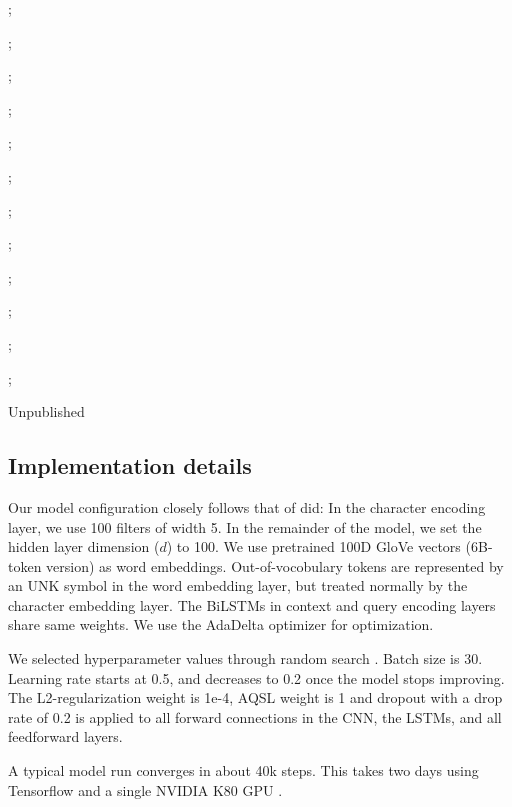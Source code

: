 \documentclass[11pt,letterpaper]{article}
\makeatletter
\newcommand{\ssymbol}[1]{^{\@fnsymbol{#1}}}
\makeatother
\begin{document}
\begin{table}[t]
\begin{threeparttable}
\begin{tablenotes}
\item[a]\citet{Rajpurkar:2016vf};\item[b] \citet{Yu:2016vg};\item[c]\citet{Yang:2016vi};\item[d]\citet{Wang:2016ws};\item[e]\citet{Xiong:2016uq};\item[f]\citet{Seo:2016tp};\item[g]\citet{Lee:2016td};\item[h]\citet{Wang:2016vv};\item[i]\citet{Weissenborn:2017wa};\item[j]\citet{Document_reader2017arXiv170400051C}; \item[k]\citet{Shen:2016uu};\item[l]\citet{Zhang:2017wl};\item[$\ssymbol{3}$]Unpublished
\end{tablenotes}
\end{threeparttable}
\renewcommand*{\thefootnote}{\arabic{footnote}}
\end{table}


\subsection{Implementation details}

Our model configuration closely follows that of \citet{Seo:2016tp} did: In the character encoding layer, we use 100 filters of width 5. In the remainder of the model, we set the hidden layer dimension ($d$) to 100. We use pretrained 100D GloVe vectors (6B-token version) as word embeddings. Out-of-vocobulary tokens are represented by an UNK symbol in the word embedding layer, but treated normally by the character embedding layer. The BiLSTMs in context and query encoding layers share same weights. We use the AdaDelta optimizer \cite{AdaDelta2012arXiv1212.5701Z} for optimization. 

We selected hyperparameter values through random search \cite{random_grid_search_Bergstra:2012ux}. Batch size is 30. Learning rate starts at 0.5, and decreases to 0.2 once the model stops improving. The L2-regularization weight is 1e-4, AQSL weight is 1 and dropout with a drop rate of 0.2 is applied to all forward connections in the CNN, the LSTMs, and all feedforward layers. 

A typical model run converges in about 40k steps. This takes two days using Tensorflow \cite{tensorflow2015-whitepaper} and a single NVIDIA K80 GPU .
\end{document}
